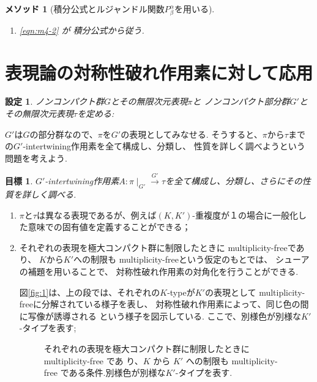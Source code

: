 \documentclass[12pt]{article} %
\newcommand{\kana}[2]{#1}
\newtheorem*{setting*}{\textbf{設定}}
\newtheorem*{goal*}{\textbf{目標}}
\newtheorem{method}{\textbf{メソッド}}
\theoremstyle{remark}
\begin{document}
{\begin{method}[積分公式とルジャンドル関数$ P^\alpha_\beta$を用いる]
\begin{enumerate}
		\item \eqref{eqn:m4-2} が \cite[L2]{kobayashi2011schrodinger}積分公式から従う.
	\end{enumerate}
\end{method}
\section{表現論の対称性破れ作用素に対して応用}
\newcommand{\mysbo}{A:\pi\mid_{G'}\xrightarrow{G'}\tau}
	\begin{setting*}
ノンコンパクト群$G$とその無限次元表現$\pi$と
ノンコンパクト部分群$G'$とその無限次元表現$\tau$を定める:\\
	\centerline{
		\xymatrixcolsep{0.5pc}
		\xymatrixrowsep{1pc}
		}
	\end{setting*}
$G'$は$G$の部分群なので、$\pi$を$G'$の表現としてみなせる.
そうすると、$\pi$から$\tau$までの$G'$-intertwining作用素を全て構成し、分類し、
性質を詳しく調べようという問題を考えよう.
	\begin{goal*}
		$G'$-intertwining作用素$\mysbo$を全て構成し、分類し、さらにその性質を詳しく調べる.
	\end{goal*}
	\begin{enumerate}
		\item $\pi$と$\tau$は異なる表現であるが、例えば$(K,K')$-重複度が１の場合に一般化した意味での固有値を定義することができる；
		\item
それぞれの表現を極大コンパクト群に制限したときに
multiplicity-freeであり、
$K$から$K'$への制限も multiplicity-freeという仮定のもとでは、
シューアの補題を用いることで、
対称性破れ作用素の\kana{対角化}{タイカクカ}を行うことができる.

図\ref{fig:1}は、上の段では、それぞれの$K$-typeが$K'$の表現として
multiplicity-freeに分解されている様子を表し、
対称性破れ作用素によって、同じ色の間に写像が誘導される
という様子を\kana{図示}{ずし}している.
ここで、別様色が別様な$K'$-タイプを表す;
\begin{figure}[h]
	\centering
	\begin{tikzpicture}[rotate=-90,scale=2]
	
	\end{tikzpicture}%
	\caption{
	それぞれの表現を極大コンパクト群に制限したときに multiplicity-free であ り、$K$ から $K'$ への制限も multiplicity-free
	である条件.別様色が別様な$K'$-タイプを表す.}


\end{figure}
\end{enumerate}}
\end{document}
